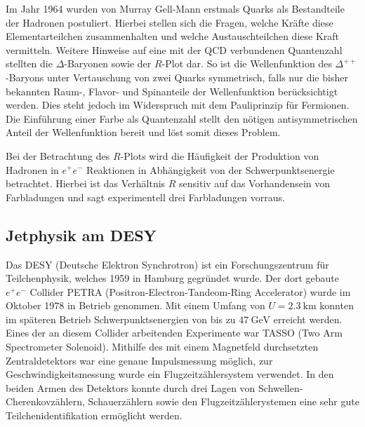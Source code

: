 Im Jahr 1964 wurden von Murray Gell-Mann erstmals Quarks als Bestandteile der Hadronen postuliert.
Hierbei stellen sich die Fragen, welche Kräfte diese Elementarteilchen zusammenhalten und welche Austauschteilchen diese Kraft vermitteln.
Weitere Hinweise auf eine mit der QCD verbundenen Quantenzahl stellten die $\Delta$-Baryonen sowie der $R$-Plot dar.
So ist die Wellenfunktion des $\Delta^{++}$-Baryons unter Vertauschung von zwei Quarks symmetrisch, falls nur die bisher bekannten Raum-, Flavor- und Spinanteile der Wellenfunktion berücksichtigt werden.
Dies steht jedoch im Widerspruch mit dem Pauliprinzip für Fermionen.
Die Einführung einer Farbe als Quantenzahl stellt den nötigen antisymmetrischen Anteil der Wellenfunktion bereit und löst somit dieses Problem.

Bei der Betrachtung des $R$-Plots wird die Häufigkeit der Produktion von Hadronen in $e^+ e^-$ Reaktionen in Abhängigkeit von der Schwerpunktsenergie betrachtet.
Hierbei ist das Verhältnis $R$ sensitiv auf das Vorhandensein von Farbladungen und sagt experimentell drei Farbladungen vorraus.

\subsection{Jetphysik am DESY}
Das DESY (Deutsche Elektron Synchrotron) ist ein Forschungszentrum für Teilchenphysik, welches 1959 in Hamburg gegründet wurde.
Der dort gebaute $e^+ e^-$ Collider PETRA (Positron-Electron-Tandeom-Ring Accelerator) wurde im Oktober 1978 in Betrieb genommen.
Mit einem Umfang von $U=\SI{2.3}{\kilo\metre}$ konnten im späteren Betrieb Schwerpunktsenergien von bis zu $\SI{47}{\giga\electronvolt}$ erreicht werden.
Eines der an diesem Collider arbeitenden Experimente war TASSO (Two Arm Spectrometer Solenoid).
Mithilfe des mit einem Magnetfeld durchsetzten Zentraldetektors war eine genaue Impulsmessung möglich, zur Geschwindigkeitsmessung wurde ein Flugzeitzählersystem verwendet.
In den beiden Armen des Detektors konnte durch drei Lagen von Schwellen-Cherenkovzählern, Schauerzählern sowie den Flugzeitzählerystemen eine sehr gute Teilchenidentifikation ermöglicht werden.

